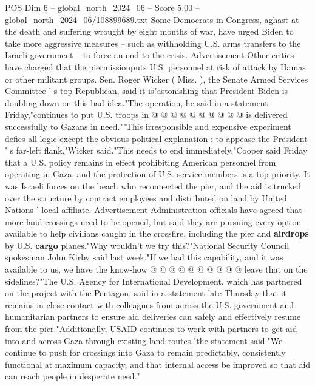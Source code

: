 \begin{textsample}{POS Dim 6 – global\_north\_2024\_06 – Score 5.00 – global\_north\_2024\_06/108899689.txt}
Some Democrats in Congress, aghast at the death and suffering wrought by eight months of war, have urged Biden to take more aggressive measures -- such as withholding U.S. arms transfers to the Israeli government -- to force an end to the crisis.
Advertisement Other critics have charged that the piermissionputs U.S. personnel at risk of attack by Hamas or other militant groups.
Sen.
Roger Wicker ( Miss. ), the Senate Armed Services Committee ' s top Republican, said it is"astonishing that President Biden is doubling down on this bad idea."The operation, he said in a statement Friday,"continues to put U.S. troops in @ @ @ @ @ @ @ @ @ @ is delivered successfully to Gazans in need.""This irresponsible and expensive experiment defies all logic except the obvious political explanation : to appease the President ' s far-left flank,"Wicker said."This needs to end immediately."Cooper said Friday that a U.S. policy remains in effect prohibiting American personnel from operating in Gaza, and the protection of U.S. service members is a top priority.
It was Israeli forces on the beach who reconnected the pier, and the aid is trucked over the structure by contract employees and distributed on land by United Nations ' local affiliate.
Advertisement Administration officials have agreed that more land crossings need to be opened, but said they are pursuing every option available to help civilians caught in the crossfire, including the pier and \textbf{airdrops} by U.S. \textbf{cargo} planes."Why wouldn't we try this?"National Security Council spokesman John Kirby said last week."If we had this capability, and it was available to us, we have the know-how @ @ @ @ @ @ @ @ @ @ leave that on the sidelines?"The U.S.
Agency for International Development, which has partnered on the project with the Pentagon, said in a statement late Thursday that it remains in close contact with colleagues from across the U.S. government and humanitarian partners to ensure aid deliveries can safely and effectively resume from the pier."Additionally, USAID continues to work with partners to get aid into and across Gaza through existing land routes,"the statement said."We continue to push for crossings into Gaza to remain predictably, consistently functional at maximum capacity, and that internal access be improved so that aid can reach people in desperate need."

\end{textsample}
